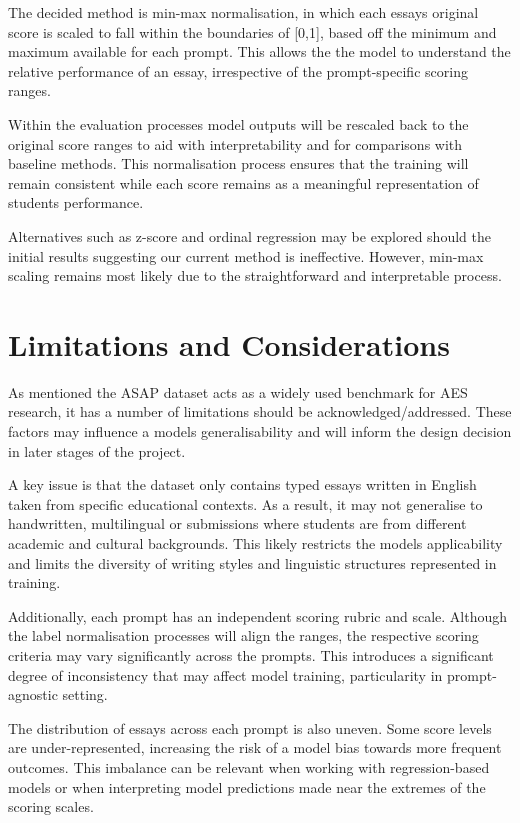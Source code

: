 \documentclass[10pt]{report}
\begin{document}
The decided method is min-max normalisation, in which each essays original score is scaled to fall within the boundaries of [0,1], based off the minimum and maximum available for each prompt. This allows the the model to understand the relative performance of an essay, irrespective of the prompt-specific scoring ranges.

Within the evaluation processes model outputs will be rescaled back to the original score ranges to aid with interpretability and for comparisons with baseline methods. This normalisation process ensures that the training will remain consistent while each score remains as a meaningful representation of students performance.

Alternatives such as z-score and ordinal regression may be explored should the initial results suggesting our current method is ineffective. However, min-max scaling remains most likely due to the straightforward and interpretable process.

\section{Limitations and Considerations}
As mentioned the ASAP dataset acts as a widely used benchmark for AES research, it has a number of limitations should be acknowledged/addressed. These factors may influence a models generalisability and will inform the design decision in later stages of the project.

A key issue is that the dataset only contains typed essays written in English taken from specific educational contexts. As a result, it may not generalise to handwritten, multilingual or submissions where students are from different academic and cultural backgrounds. This likely restricts the models applicability and limits the diversity of writing styles and linguistic structures represented in training. 

Additionally, each prompt has an independent scoring rubric and scale. Although the label normalisation processes will align the ranges, the respective scoring criteria may vary significantly across the prompts. This introduces a significant degree of inconsistency that may affect model training, particularity in prompt-agnostic setting. 

The distribution of essays across each prompt is also uneven. Some score levels are under-represented, increasing the risk of a model bias towards more frequent outcomes. This imbalance can be relevant when working with regression-based models or when interpreting model predictions made near the extremes of the scoring scales.
\end{document}
